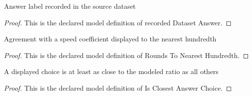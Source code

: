 \begin{definition}
  \label{def:physics:phyx-mini-0569:phyxminiproblems-problemphyxmini0569-recordeddatasetanswer}
  Answer label recorded in the source dataset
\end{definition}
\begin{proof}
  This is the declared model definition of recorded Dataset Answer.
\end{proof}
\begin{definition}
  \label{def:physics:phyx-mini-0569:phyxminiproblems-problemphyxmini0569-roundstonearesthundredth}
  Agreement with a speed coefficient displayed to the nearest hundredth
\end{definition}
\begin{proof}
  This is the declared model definition of Rounds To Nearest Hundredth.
\end{proof}
\begin{definition}
  \label{def:physics:phyx-mini-0569:phyxminiproblems-problemphyxmini0569-isclosestanswerchoice}
  A displayed choice is at least as close to the modeled ratio as all others
\end{definition}
\begin{proof}
  This is the declared model definition of Is Closest Answer Choice.
\end{proof}
